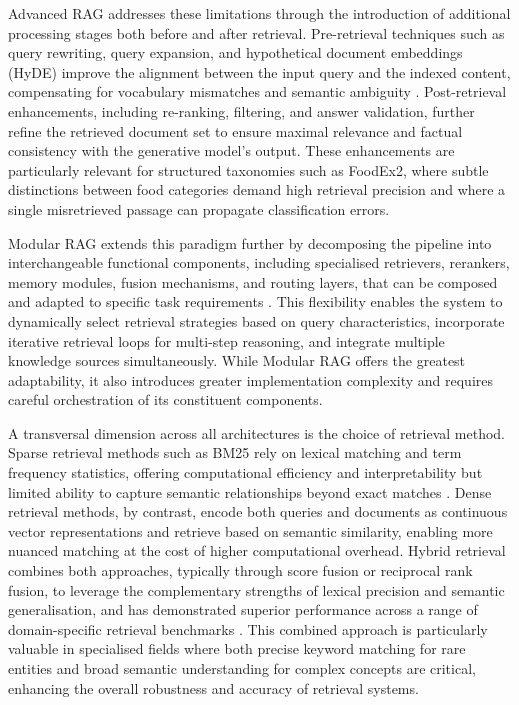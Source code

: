 Advanced RAG addresses these limitations through the introduction of additional processing stages both before and after retrieval. Pre-retrieval techniques such as query rewriting, query expansion, and hypothetical document embeddings (HyDE) improve the alignment between the input query and the indexed content, compensating for vocabulary mismatches and semantic ambiguity \parencite{c__edwards_c148eac9,honglin_wan_dd61983a}. Post-retrieval enhancements, including re-ranking, filtering, and answer validation, further refine the retrieved document set to ensure maximal relevance and factual consistency with the generative model's output. These enhancements are particularly relevant for structured taxonomies such as FoodEx2, where subtle distinctions between food categories demand high retrieval precision and where a single misretrieved passage can propagate classification errors.

Modular RAG extends this paradigm further by decomposing the pipeline into interchangeable functional components, including specialised retrievers, rerankers, memory modules, fusion mechanisms, and routing layers, that can be composed and adapted to specific task requirements \parencite{he_lin_7c94f881,andrea_matarazzo_da58af1d,aditi_singh_80d83cb6}. This flexibility enables the system to dynamically select retrieval strategies based on query characteristics, incorporate iterative retrieval loops for multi-step reasoning, and integrate multiple knowledge sources simultaneously. While Modular RAG offers the greatest adaptability, it also introduces greater implementation complexity and requires careful orchestration of its constituent components.

A transversal dimension across all architectures is the choice of retrieval method. Sparse retrieval methods such as BM25 rely on lexical matching and term frequency statistics, offering computational efficiency and interpretability but limited ability to capture semantic relationships beyond exact matches \parencite{yunfan_gao_9386ae73}. Dense retrieval methods, by contrast, encode both queries and documents as continuous vector representations and retrieve based on semantic similarity, enabling more nuanced matching at the cost of higher computational overhead. Hybrid retrieval combines both approaches, typically through score fusion or reciprocal rank fusion, to leverage the complementary strengths of lexical precision and semantic generalisation, and has demonstrated superior performance across a range of domain-specific retrieval benchmarks \parencite{yunfan_gao_9386ae73,akshay_govind_srinivasan_fc4e560a}. This combined approach is particularly valuable in specialised fields where both precise keyword matching for rare entities and broad semantic understanding for complex concepts are critical, enhancing the overall robustness and accuracy of retrieval systems.

